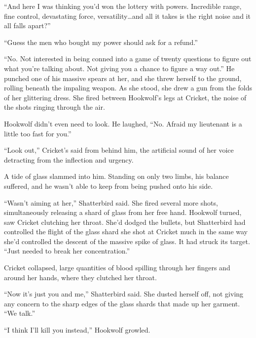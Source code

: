 ``And here I was thinking you'd won the lottery with powers.  Incredible range, fine control, devastating force, versatility\ldots and all it takes is the right noise and it all falls apart?''



``Guess the men who bought my power should ask for a refund.''



``No.  Not interested in being conned into a game of twenty questions to figure out what you're talking about.  Not giving you a chance to figure a way out.''  He punched one of his massive spears at her, and she threw herself to the ground, rolling beneath the impaling weapon.  As she stood, she drew a gun from the folds of her glittering dress.  She fired between Hookwolf's legs at Cricket, the noise of the shots ringing through the air.



Hookwolf didn't even need to look.  He laughed, ``No.  Afraid my lieutenant is a little too fast for you.''



``Look out,'' Cricket's said from behind him, the artificial sound of her voice detracting from the inflection and urgency.



A tide of glass slammed into him.  Standing on only two limbs, his balance suffered, and he wasn't able to keep from being pushed onto his side.



``Wasn't aiming at her,'' Shatterbird said.  She fired several more shots, simultaneously releasing a shard of glass from her free hand.  Hookwolf turned, saw Cricket clutching her throat.  She'd dodged the bullets, but Shatterbird had controlled the flight of the glass shard she shot at Cricket much in the same way she'd controlled the descent of the massive spike of glass.  It had struck its target.  ``Just needed to break her concentration.''



Cricket collapsed, large quantities of blood spilling through her fingers and around her hands, where they clutched her throat.



``Now it's just you and me,'' Shatterbird said.  She dusted herself off, not giving any concern to the sharp edges of the glass shards that made up her garment.  ``We talk.''



``I think I'll kill you instead,'' Hookwolf growled.



